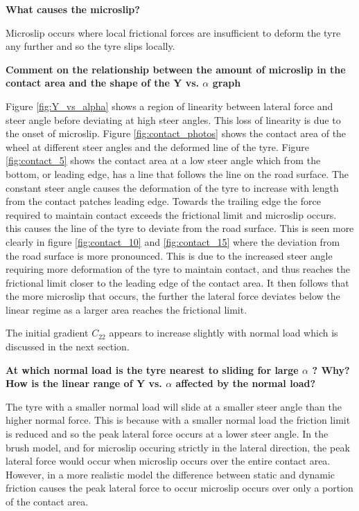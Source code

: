 \documentclass{article}
\begin{document}
\begin{center}
    \textbf{What causes the microslip?}
\end{center}
Microslip occurs where local frictional forces are insufficient to deform the tyre any further and so the tyre slips locally.

\begin{center}
    \textbf{Comment on the relationship between the amount of microslip in the contact area and
    the shape of the Y vs. $ \alpha $ graph}
\end{center}

Figure \ref{fig:Y_vs_alpha} shows a region of linearity between lateral force and steer angle before deviating at high steer angles.
This loss of linearity is due to the onset of microslip.
Figure \ref{fig:contact_photos} shows the contact area of the wheel at different steer angles and the deformed line of the tyre. %
Figure \ref{fig:contact_5} shows the contact area at a low steer angle which from the bottom, or leading edge, has a line that follows the line on the road surface.
The constant steer angle causes the deformation of the tyre to increase with length from the contact patches leading edge.
Towards the trailing edge the force required to maintain contact exceeds the frictional limit and microslip occurs.
this causes the line of the tyre to deviate from the road surface.
This is seen more clearly in figure \ref{fig:contact_10} and \ref{fig:contact_15} where the deviation from the road surface is more pronounced.
This is due to the increased steer angle requiring more deformation of the tyre to maintain contact, and thus reaches the frictional limit closer to the leading edge of the contact area.
It then follows that the more microslip that occurs, the further the lateral force deviates below the linear regime as a larger area reaches the frictional limit.

The initial gradient $C_{22}$ appears to increase slightly with normal load which is discussed in the next section.

\begin{center}
    \textbf{At which normal load is the tyre nearest to sliding for large
    $ \alpha $ ? Why? How is the
    linear range of Y vs.
    $ \alpha $ affected by the normal load?}
\end{center}

The tyre with a smaller normal load will slide at a smaller steer angle than the higher normal force.
This is because with a smaller normal load the friction limit is reduced and so the peak lateral force occurs at a lower steer angle.
In the brush model, and for microslip occuring strictly in the lateral direction, the peak lateral force would occur when microslip occurs over the entire contact area.
However, in a more realistic model the difference between static and dynamic friction causes the peak lateral force to occur microslip occurs over only a portion of the contact area.
\end{document}
